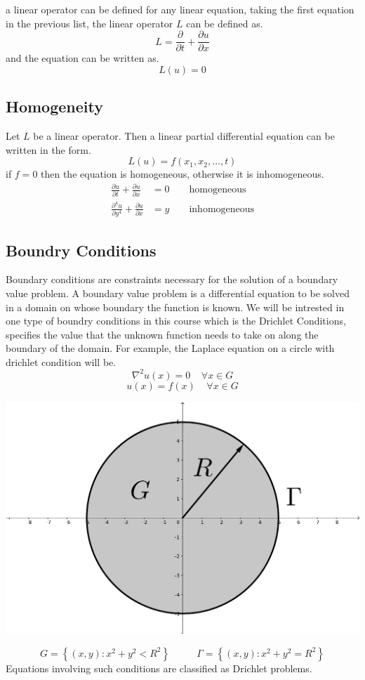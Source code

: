 \documentclass[]{article}
\begin{document}
a linear operator can be defined for any linear equation, taking the first equation in the previous list, the linear operator $L$ can be defined as.
\[
L = \frac{\partial }{\partial t} + \frac{\partial u}{\partial x}
\]
and the equation can be written as.
\[
    L(u)=0    
\]

\subsection{Homogeneity}
Let $L$ be a linear operator. Then a linear partial differential equation can be written in the form.
\[
    L(u) = f(x_1,x_2, \dots , t)    
\]
if $f = 0$ then the equation is homogeneous, otherwise it is inhomogeneous.
\begin{align*}
\frac{\partial u}{\partial t} + \frac{\partial u}{\partial x} &= 0 \quad\quad \text{homogeneous}
\\
\frac{\partial^4 u}{\partial y^4} + \frac{\partial u}{\partial x} &= y \quad\quad \text{inhomogeneous}
\end{align*}

\subsection{Boundry Conditions}
Boundary conditions are constraints necessary for the solution of a boundary value problem. A boundary value problem is a differential equation to be solved in a domain on whose boundary the function is known. We will be intrested in one type of boundry conditions in this course which is the Drichlet Conditions, specifies the value that the unknown function needs to take on along the boundary of the domain. For example, the Laplace equation on a circle with drichlet condition will be.
\[
    \nabla^2 u(x) = 0 \;\;\;\; \forall x \in G    
\]
\[
    u(x) = f(x) \;\;\;\; \forall x \in G    
\]
\begin{center}
\includegraphics[scale=0.1]{laplacecircle.png} 
\end{center}
\[
    G = \left\lbrace (x,y):x^2+y^2 < R^2 \right\rbrace  \;\;\;\;\;\;\;\;\;\ \Gamma = \left\lbrace (x,y):x^2+y^2 = R^2 \right\rbrace    
\]
Equations involving such conditions are classified as Drichlet problems.
\end{document}
